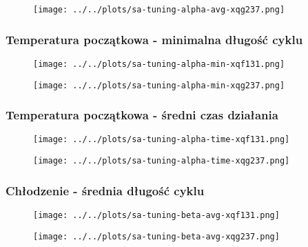 \documentclass{article}
\begin{document}
    \begin{figure}[h!]
        \centering
        \texttt{[image: ../../plots/sa-tuning-alpha-avg-xqg237.png]}
    \end{figure}

\newpage

\subsubsection*{Temperatura początkowa - minimalna długość cyklu}
    \begin{figure}[h!]
        \centering
        \texttt{[image: ../../plots/sa-tuning-alpha-min-xqf131.png]}
    \end{figure}

    \begin{figure}[h!]
        \centering
        \texttt{[image: ../../plots/sa-tuning-alpha-min-xqg237.png]}
    \end{figure}

\newpage

\subsubsection*{Temperatura początkowa - średni czas działania}
    \begin{figure}[h!]
        \centering
        \texttt{[image: ../../plots/sa-tuning-alpha-time-xqf131.png]}
    \end{figure}

    \begin{figure}[h!]
        \centering
        \texttt{[image: ../../plots/sa-tuning-alpha-time-xqg237.png]}
    \end{figure}


\newpage 

\subsubsection*{Chłodzenie - średnia długość cyklu}
    \begin{figure}[h!]
        \centering
        \texttt{[image: ../../plots/sa-tuning-beta-avg-xqf131.png]}
    \end{figure}

    \begin{figure}[h!]
        \centering
        \texttt{[image: ../../plots/sa-tuning-beta-avg-xqg237.png]}
    \end{figure}
\end{document}
